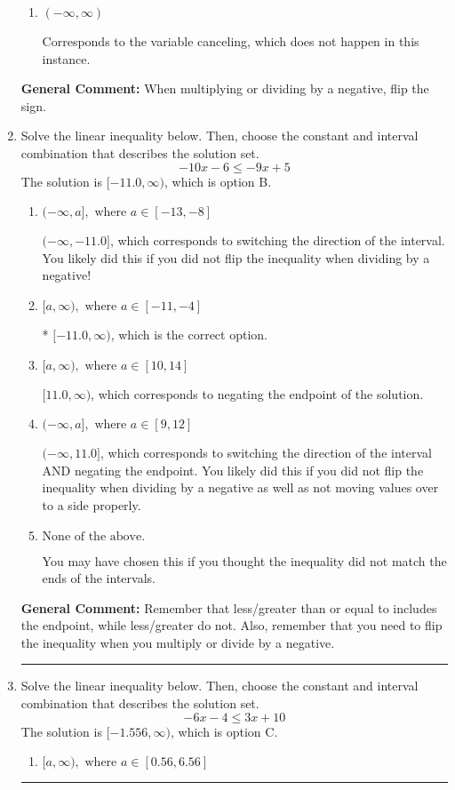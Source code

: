 \documentclass{extbook}[14pt]
\newcommand{\litem}[1]{\item #1

\rule{\textwidth}{0.4pt}}
\begin{document}
\begin{enumerate}
{\begin{enumerate}[label=\Alph*.]
Corresponds to inverting the inequality and negating the solution.
\item \( (-\infty, \infty) \)

Corresponds to the variable canceling, which does not happen in this instance.
\end{enumerate}

\textbf{General Comment:} When multiplying or dividing by a negative, flip the sign.
}
\litem{
Solve the linear inequality below. Then, choose the constant and interval combination that describes the solution set.
\[ -10x -6 \leq -9x + 5 \]The solution is \( [-11.0, \infty) \), which is option B.\begin{enumerate}[label=\Alph*.]
\item \( (-\infty, a], \text{ where } a \in [-13, -8] \)

 $(-\infty, -11.0]$, which corresponds to switching the direction of the interval. You likely did this if you did not flip the inequality when dividing by a negative!
\item \( [a, \infty), \text{ where } a \in [-11, -4] \)

* $[-11.0, \infty)$, which is the correct option.
\item \( [a, \infty), \text{ where } a \in [10, 14] \)

 $[11.0, \infty)$, which corresponds to negating the endpoint of the solution.
\item \( (-\infty, a], \text{ where } a \in [9, 12] \)

 $(-\infty, 11.0]$, which corresponds to switching the direction of the interval AND negating the endpoint. You likely did this if you did not flip the inequality when dividing by a negative as well as not moving values over to a side properly.
\item \( \text{None of the above}. \)

You may have chosen this if you thought the inequality did not match the ends of the intervals.
\end{enumerate}

\textbf{General Comment:} Remember that less/greater than or equal to includes the endpoint, while less/greater do not. Also, remember that you need to flip the inequality when you multiply or divide by a negative.
}
\litem{
Solve the linear inequality below. Then, choose the constant and interval combination that describes the solution set.
\[ -6x -4 \leq 3x + 10 \]The solution is \( [-1.556, \infty) \), which is option C.\begin{enumerate}[label=\Alph*.]
\item \( [a, \infty), \text{ where } a \in [0.56, 6.56] \)


\end{enumerate}}
\end{enumerate}
\end{document}
